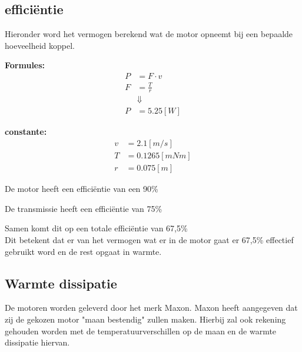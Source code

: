 \subsection{efficiëntie}

Hieronder word het vermogen berekend wat de motor opneemt bij een bepaalde hoeveelheid koppel.

\begin{multicols}{2}
        \textbf{Formules:}
        \begin{equation}
            \begin{split}
                P &= F \cdot v \\
                F &= \frac{T}{r} \\
                &\Downarrow \\
                P &= 5.25 [W]
            \end{split}
        \end{equation}

        \textbf{constante:}
        \begin{equation*}
            \begin{split}
                v &= 2.1 [m/s] \\
                T &= 0.1265[mNm]  \\
                r &= 0.075[m]
            \end{split}
        \end{equation*}
    \end{multicols}

De motor heeft een efficiëntie van een 90\%

De transmissie heeft een efficiëntie van 75\%

Samen komt dit op een totale efficiëntie van 67,5\% \\
Dit betekent dat er van het vermogen wat er in de motor gaat er 67,5\% effectief gebruikt word en de rest opgaat in warmte.

\subsection{Warmte dissipatie}

De motoren worden geleverd door het merk Maxon. Maxon heeft aangegeven dat zij de gekozen motor "maan bestendig" zullen maken. Hierbij zal ook rekening gehouden worden met de temperatuurverschillen op de maan en de warmte dissipatie hiervan. 